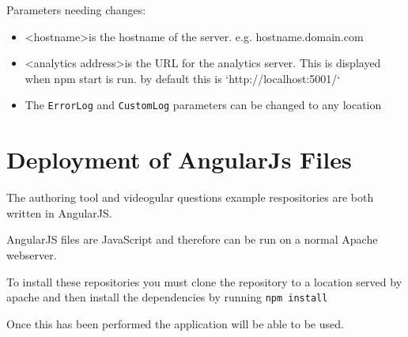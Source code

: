 Parameters needing changes:

\begin{itemize}
\item \textless hostname\textgreater is the hostname of the server. e.g. hostname.domain.com
\item \textless analytics address\textgreater is the URL for the analytics server. This is displayed when npm start is run. by default this is `http://localhost:5001/`
\item The \lstinline|ErrorLog| and \lstinline|CustomLog| parameters can be changed to any location
\end{itemize}

\section{Deployment of AngularJs Files} \label{Section:Deployment of AngularJs Files}

The authoring tool and videogular questions example respositories are both written in AngularJS.

AngularJS files are JavaScript and therefore can be run on a normal Apache webserver.

To install these repositories you must clone the repository to a location served by apache and then install the dependencies by running \lstinline|npm install|

Once this has been performed the application will be able to be used.